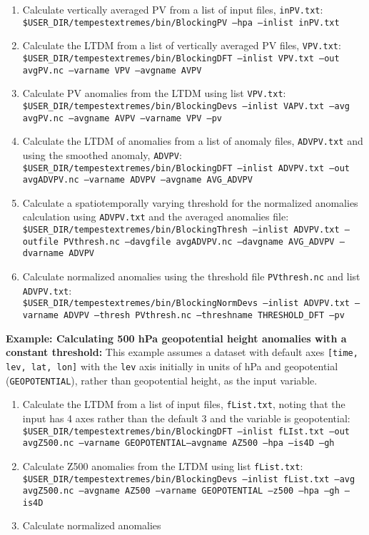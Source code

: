 \documentclass{article}
\begin{document}
\begin{enumerate}
\item Calculate vertically averaged PV from a list of input files, \texttt{inPV.txt}: \\
\texttt{\$USER\_DIR/tempestextremes/bin/BlockingPV --hpa --inlist inPV.txt }
\item Calculate the LTDM from a list of vertically averaged PV files, \texttt{VPV.txt}: \\
\texttt{\$USER\_DIR/tempestextremes/bin/BlockingDFT  --inlist VPV.txt --out avgPV.nc --varname VPV --avgname AVPV }
\item Calculate PV anomalies from the LTDM using list \texttt{VPV.txt}:\\
 \texttt{\$USER\_DIR/tempestextremes/bin/BlockingDevs --inlist VAPV.txt --avg avgPV.nc --avgname AVPV --varname VPV --pv}
\item Calculate the LTDM of anomalies from a list of anomaly files, \texttt{ADVPV.txt} and using the smoothed anomaly, \texttt{ADVPV}:\\
\texttt{\$USER\_DIR/tempestextremes/bin/BlockingDFT --inlist ADVPV.txt --out avgADVPV.nc --varname ADVPV --avgname AVG\_ADVPV}
\item Calculate a spatiotemporally varying threshold for the normalized anomalies calculation using \texttt{ADVPV.txt} and the averaged anomalies file: \\
\texttt{\$USER\_DIR/tempestextremes/bin/BlockingThresh --inlist ADVPV.txt --outfile PVthresh.nc --davgfile avgADVPV.nc --davgname AVG\_ADVPV --dvarname ADVPV}
\item Calculate normalized anomalies using the threshold file \texttt{PVthresh.nc} and list \texttt{ADVPV.txt}:\\
\texttt{\$USER\_DIR/tempestextremes/bin/BlockingNormDevs --inlist ADVPV.txt --varname ADVPV --thresh PVthresh.nc --threshname THRESHOLD\_DFT --pv}
\end{enumerate}

\textbf{Example: Calculating 500 hPa geopotential height anomalies with a constant threshold:} This example assumes a dataset with default axes \texttt{[time, lev, lat, lon]} with the \texttt{lev} axis initially in units of hPa and geopotential (\texttt{GEOPOTENTIAL}), rather than geopotential height, as the input variable.

\begin{enumerate}
\item Calculate the LTDM from a list of input files, \texttt{fList.txt}, noting that the input has 4 axes rather than the default 3 and the variable is geopotential: \\
\texttt{\$USER\_DIR/tempestextremes/bin/BlockingDFT  --inlist fLIst.txt --out avgZ500.nc --varname GEOPOTENTIAL--avgname AZ500 --hpa --is4D --gh}
\item Calculate Z500 anomalies from the LTDM using list \texttt{fList.txt}:\\
 \texttt{\$USER\_DIR/tempestextremes/bin/BlockingDevs --inlist fList.txt --avg avgZ500.nc --avgname AZ500 --varname GEOPOTENTIAL --z500 --hpa --gh --is4D}
\item Calculate normalized anomalies 
\end{enumerate}
\end{document}
